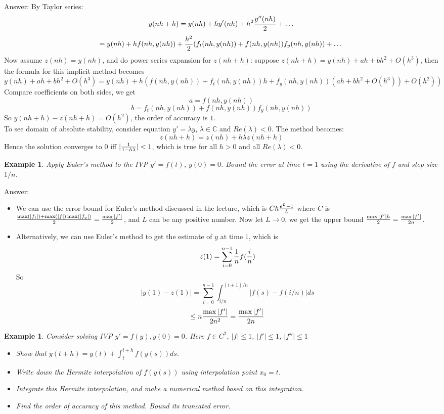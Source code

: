 \documentclass{article} %
\theoremstyle{break}
\newtheorem{exa}[definition]{Example}
\begin{document}
Answer: By Taylor series:
\[y(nh+h)=y(nh)+hy'(nh)+h^2{y''(nh)\over 2}+\dots\]
\[=y(nh)+hf(nh, y(nh))+{h^2\over 2}(f_t(nh, y(nh))+f(nh, y(nh))f_y(nh, y(nh))+\dots\]
Now assume $z(nh)=y(nh)$, and do power series expansion for $z(nh+h)$: suppose $z(nh+h)=y(nh)+ah+bh^2+O(h^3)$, then the formula for this implicit method becomes
\[y(nh)+ah+bh^2+O(h^3)=y(nh)+h(f(nh, y(nh))+f_t(nh, y(nh))h+f_y(nh, y(nh))(ah+bh^2+O(h^3))+O(h^2))\]
Compare coefficients on both sides, we get
\[a=f(nh, y(nh))\]
\[b=f_t(nh, y(nh))+f(nh, y(nh))f_y(nh, y(nh))\]
So $y(nh+h)-z(nh+h)=O(h^2)$, the order of accuracy is $1$.\\

To see domain of absolute stability, consider equation $y'=\lambda y$, $\lambda\in\mathbb{C}$ and $Re(\lambda)<0$. The method becomes:
\[z(nh+h)=z(nh)+h\lambda z(nh+h)\]
Hence the solution converges to $0$ iff $|{1\over 1-h\lambda}|<1$, which is true for all $h>0$ and all $Re(\lambda)<0$. 



\begin{exa}Apply Euler's method to the IVP $y'=f(t)$, $y(0)=0$. Bound the error at time $t=1$ using the derivative of $f$ and step size $1/n$.\end{exa}

Answer: \begin{itemize}
\item We can use the error bound for Euler's method discussed in the lecture, which is $Ch{e^L-1\over L}$ where $C$ is ${\max(|f_t|)+\max(|f|)\max(|f_y|)\over 2}={\max|f'|\over 2}$, and $L$ can be any positive number. Now let $L\rightarrow 0$, we get the upper bound ${\max|f'|h\over 2}={\max|f'|\over 2n}$.
\item Alternatively, we can use Euler's method to get the estimate of $y$ at time $1$, which is
  \[z(1)=\sum_{i=0}^{n-1}{1\over n}f({i\over n})\]
  So
  \[|y(1)-z(1)|=\sum_{i=0}^{n-1}\int_{i/n}^{(i+1)/n}|f(s)-f(i/n)|ds\]
  \[\leq n{\max|f'|\over 2n^2}={\max|f'|\over 2n}\]
\end{itemize}


\begin{exa}Consider solving IVP $y'=f(y), y(0)=0$. Here $f\in C^2$, $|f|\leq 1$, $|f'|\leq 1$, $|f''|\leq 1$
  \begin{itemize}
   \item Show that $y(t+h)=y(t)+\int_t^{t+h}f(y(s))ds$.
   \item Write down the Hermite interpolation of $f(y(s))$ using interpolation point $x_0=t$.
   \item Integrate this Hermite interpolation, and make a numerical method based on this integration.
   \item Find the order of accuracy of this method. Bound its truncated error.
  \end{itemize}
\end{exa}
\end{document}
